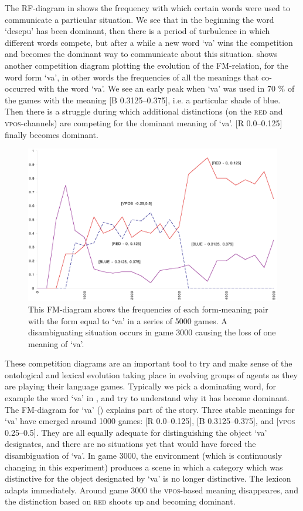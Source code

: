 The RF-diagram in  shows the 
frequency with which certain words were used to communicate 
a particular situation. We see that in
the beginning the word `desepu' has been dominant, then 
there is a period of turbulence in which different 
words compete, but after a while a new word `va' wins 
the competition and becomes the dominant way to communicate 
about this situation.  shows another
competition diagram plotting the evolution of the FM-relation, for 
the word form `va', in other words the frequencies of 
all the meanings that co-occurred with the word `va'. 
We see an early peak when `va' was used in 70 \% of the 
games with the meaning [B 0.3125–0.375], i.e. a particular
shade of blue. Then there is a struggle during which additional
distinctions (on the \textsc{red} and \textsc{vpos}-channels) are competing
for the dominant meaning of `va'. 
[R 0.0–0.125] finally becomes dominant. 

\begin{figure}[htbp]
  \centerline{\includegraphics[width=.80\textwidth]{chap7/figs/fm.pdf}}
\caption{\label{FM-diagram}This FM-diagram shows
the frequencies of each form-meaning pair with 
the form equal to `va' in a series of 5000 games.
A disambiguating situation occurs in game 3000
causing the loss of one meaning of `va'.}
\end{figure}

These competition diagrams are an important tool to try 
and make sense of the ontological and lexical evolution
taking place in evolving groups of agents as they are
playing their language games. Typically we pick
a dominating word, for example the word `va' in 
, and try to understand
why it has become dominant. 
The FM-diagram for `va' () explains
part of the story. Three stable meanings for `va' have emerged
around 1000 games: 
[R 0.0–0.125], [B 0.3125–0.375], and [\textsc{vpos} 0.25–0.5]. 
They are all equally adequate for distinguishing the object
`va' designates, and there are no situations yet
that would have forced the disambiguation of `va'. 
In game 3000, the environment (which is continuously 
changing in this experiment) produces a scene in which
a category which was distinctive for the object designated by 
`va' is no longer distinctive. The lexicon adapts 
immediately. Around game 3000 the \textsc{vpos}-based meaning disappeares, 
and the distinction based on \textsc{red} shoots up and becoming dominant. 

